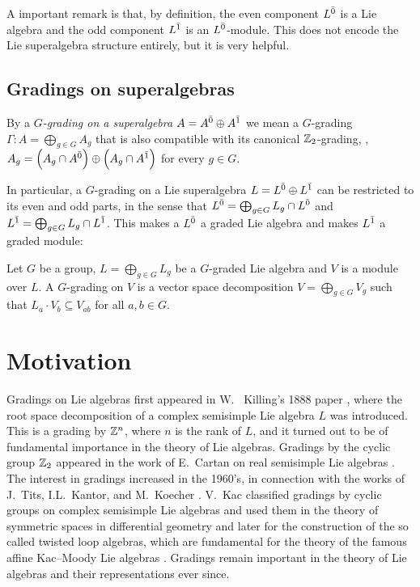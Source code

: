 A important remark is that, by definition, the even component $L^{\bar0}$ is a Lie algebra and the odd component $L^{\bar1}$ is an $L^{\bar0}$-module. This does not encode the Lie superalgebra structure entirely, but it is very helpful.

\subsection{Gradings on superalgebras}

By a \emph{$G$-grading on a superalgebra $A = A^{\bar0}\oplus A^{\bar1}$} we mean a $G$-grading $\Gamma : A= \bigoplus_{g \in G} A_g$ that is also compatible with its canonical $\mathbb{Z}_{2}$-grading, \ie, $A_g=\left(A_g\cap A^{\bar0}\right)\oplus\left(A_g\cap A^{\bar1}\right)$ for every $g\in G$.

In particular, a $G$-grading on a Lie superalgebra $L=L^{\bar0}\oplus L^{\bar1}$ can be restricted to its even and odd parts, in the sense that $L^{\bar0} = \bigoplus_{g\in G} L_g\cap L^{\bar0}$ and $L^{\bar1} = \bigoplus_{g\in G} L_g\cap L^{\bar1}$. This makes a $L^{\bar0}$ a graded Lie algebra and makes $L^{\bar1}$ a graded module:

\begin{defi}
Let $G$ be a group, $L = \bigoplus_{g\in G} L_g$ be a $G$-graded Lie algebra and $V$ is a module over $L$. A $G$-grading on $V$ is a vector space decomposition $V=\bigoplus_{g\in G} V_g$ such that $L_a\cdot V_b \subseteq V_{ab}$ for all $a,b\in G$.
\end{defi}

\section{Motivation}

Gradings on Lie algebras first appeared in W.~ Killing’s 1888 paper \cite{MR1510529}, where the root space decomposition of a complex semisimple Lie algebra $L$ was introduced. This is a grading by $\mathbb{Z}^n$, where $n$ is the rank of $L$, and it turned out to be of fundamental importance in the theory of Lie algebras. Gradings by the cyclic group $\mathbb{Z}_2$ appeared in the work of E.~Cartan on real semisimple Lie algebras \cite{Cartan-1914}. The interest in gradings increased in the 1960's, in connection with the works of J.~Tits, I.L.~Kantor, and M.~Koecher \cite{Tit62,Kan64,Koe67}. V.~Kac classified gradings by cyclic groups on complex semisimple Lie algebras and used them in the theory of symmetric spaces in differential geometry \cite{Kac68} and later for the construction of the so called twisted loop algebras, which are fundamental for the theory of the famous affine Kac--Moody Lie algebras \cite{Kac90}. Gradings remain important in the theory of Lie algebras and their representations ever since.

